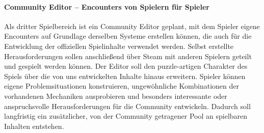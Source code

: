     \paragraph{Community Editor -- Encounters von Spielern für Spieler}
    Als dritter Spielbereich ist ein Community Editor geplant, mit dem Spieler eigene Encounters auf Grundlage derselben Systeme erstellen können, die auch für die Entwicklung der offiziellen Spielinhalte verwendet werden. Selbst erstellte Herausforderungen sollen anschließend über Steam mit anderen Spielern geteilt und gespielt werden können.
    Der Editor soll den puzzle-artigen Charakter des Spiels über die von uns entwickelten Inhalte hinaus erweitern. Spieler können eigene Problemsituationen konstruieren, ungewöhnliche Kombinationen der vorhandenen Mechaniken ausprobieren und besonders interessante oder anspruchsvolle Herausforderungen für die Community entwickeln. Dadurch soll langfristig ein zusätzlicher, von der Community getragener Pool an spielbaren Inhalten entstehen.
